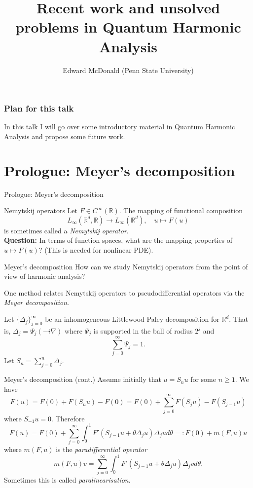 \documentclass{beamer}
\newcommand\makebeamertitle{\frame{\maketitle}}%
\numberwithin{equation}{section}
\theoremstyle{plain}
\theoremstyle{plain}
\theoremstyle{definition}
\theoremstyle{plain}
\theoremstyle{plain}
\theoremstyle{definition}
\newcommand{\Rl}{\mathbb{R}}
\begin{document}
\title[Progress and Questions in QHA]{Recent work and unsolved problems in Quantum Harmonic Analysis}

\author[E. McDonald]{Edward McDonald (Penn State University)}



\makebeamertitle

\begin{frame}\frametitle{Plan for this talk}
    In this talk I will go over some introductory material in Quantum Harmonic Analysis and propose some future work.
\end{frame}

\section{Prologue: Meyer's decomposition}\label{meyer_section}

\begin{frame}
    \Huge{Prologue: Meyer's decomposition}
\end{frame}


\begin{frame}{Nemytskij operators}
    Let $F\in C^\infty(\Rl).$ The mapping of functional composition
    \[
        L_{\infty}(\Rl^d,\Rl)\to L_{\infty}(\Rl^d),\quad u\mapsto F(u)
    \]
    is sometimes called a \emph{Nemytskij operator}.\\
\pause
    \textbf{Question:} In terms of function spaces, what are the mapping properties of $u\mapsto F(u)$? (This is needed for nonlinear PDE).
\end{frame}

\begin{frame}{Meyer's decomposition}
    How can we study Nemytskij operators from the point of view of harmonic analysis?\pause

    One method relates Nemytskij operators to pseudodifferential operators via the \emph{Meyer decomposition}.\pause

    Let $\{\Delta_j\}_{j=0}^\infty$ be an inhomogeneous Littlewood-Paley decomposition for $\Rl^d.$ That is, $\Delta_j = \Psi_j(-i\nabla)$ where $\Psi_j$
    is supported in the ball of radius $2^j$ and
    \[
        \sum_{j=0}^\infty \Psi_j = 1.
    \]
    Let $S_n = \sum_{j=0}^n\Delta_j.$
\end{frame}

\begin{frame}{Meyer's decomposition (cont.)}
    Assume initially that $u=S_nu$ for some $n\geq 1.$ We have
    \[
        F(u) = F(0)+F(S_nu)-F(0) = F(0)+\sum_{j=0}^\infty F(S_ju)-F(S_{j-1}u)
    \]
    where $S_{-1}u=0.$ Therefore
    \[
        F(u) = F(0)+\sum_{j=0}^\infty \int_0^1 F'(S_{j-1}u+\theta \Delta_j u)\Delta_j u d\theta =: F(0)+m(F,u)u
    \]
    where $m(F,u)$ is the \emph{paradifferential operator}
    \[
        m(F,u)v = \sum_{j=0}^\infty \int_0^1 F'(S_{j-1}u+\theta \Delta_ju)\Delta_jv d\theta.
    \]
    Sometimes this is called \emph{paralinearisation}.
\end{frame}
\end{document}
